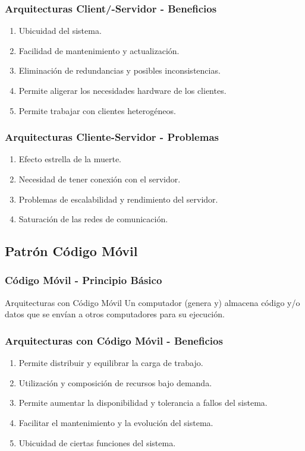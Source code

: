 \documentclass[handout,a4paper,t,xcolor=pst,dvips,colortheme]{beamer}
\begin{document}
\begin{frame}[c]
    \frametitle{Arquitecturas Client/-Servidor - Beneficios}
    \begin{enumerate}[<+->]
        \item Ubicuidad del sistema.
        \item Facilidad de mantenimiento y actualización.
        \item Eliminación de redundancias y posibles inconsistencias.
        \item Permite aligerar los necesidades hardware de los clientes.
        \item Permite trabajar con clientes heterogéneos.
    \end{enumerate}
\end{frame}

\begin{frame}[c]
    \frametitle{Arquitecturas Cliente-Servidor - Problemas}
    \begin{enumerate}[<+->]
        \item Efecto estrella de la muerte.
        \item Necesidad de tener conexión con el servidor.
        \item Problemas de escalabilidad y rendimiento del servidor.
        \item Saturación de las redes de comunicación.
    \end{enumerate}
\end{frame}

\subsection{Patrón Código Móvil}

\begin{frame}[c]
    \frametitle{Código Móvil - Principio Básico}
    \begin{block}{Arquitecturas con Código Móvil}
        Un computador (genera y) almacena código y/o datos que se envían a otros computadores para su ejecución.
    \end{block}
\end{frame}

\begin{frame}[c]
    \frametitle{Arquitecturas con Código Móvil - Beneficios}
    \begin{enumerate}[<+->]
        \item Permite distribuir y equilibrar la carga de trabajo.
        \item Utilización y composición de recursos bajo demanda.
        \item Permite aumentar la disponibilidad y tolerancia a fallos del sistema.
        \item Facilitar el mantenimiento y la evolución del sistema.
        \item Ubicuidad de ciertas funciones del sistema.
    \end{enumerate}
\end{frame}
\end{document}
